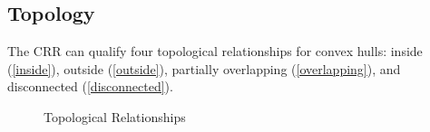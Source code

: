 \documentclass[12pt]{ucthesis}
\begin{document}



\subsection{Topology}
The CRR can qualify four topological relationships for convex hulls: inside (\ref{inside}), outside (\ref{outside}), partially overlapping (\ref{overlapping}), and disconnected (\ref{disconnected}). 

\begin{figure}[b]
 \centering
 \hspace{4 mm}
  \hspace{4 mm}
 \hspace{2 mm}
 \caption{Topological Relationships}
\label{topoloy}
\end{figure}
\end{document}
